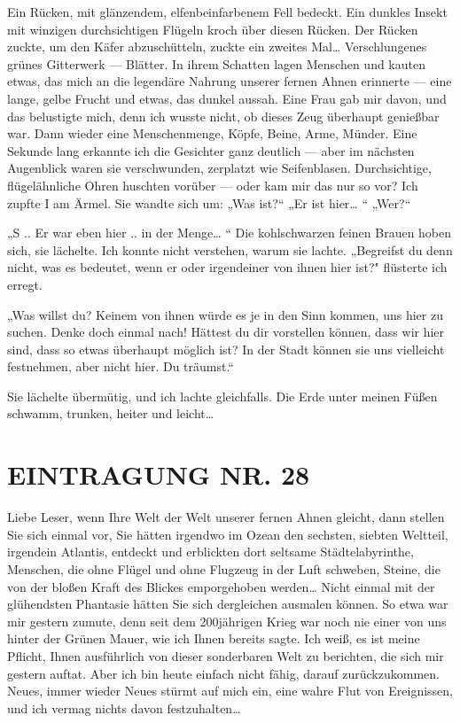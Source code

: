 Ein Rücken, mit glänzendem, elfenbeinfarbenem Fell bedeckt. Ein
dunkles Insekt mit winzigen durchsichtigen Flügeln kroch über
diesen Rücken. Der Rücken zuckte, um den Käfer abzuschütteln,
zuckte ein zweites Mal\ldots{} Verschlungenes grünes Gitterwerk —
Blätter. In ihrem Schatten lagen Menschen und kauten etwas, das
mich an die legendäre Nahrung unserer fernen Ahnen erinnerte — eine
lange, gelbe Frucht und etwas, das dunkel aussah. Eine Frau gab mir
davon, und das belustigte mich, denn ich wusste nicht, ob dieses
Zeug überhaupt genießbar war. Dann wieder eine Menschenmenge,
Köpfe, Beine, Arme, Münder. Eine Sekunde lang erkannte ich die
Gesichter ganz deutlich — aber im nächsten Augenblick waren sie
verschwunden, zerplatzt wie Seifenblasen. Durchsichtige,
flügelähnliche Ohren huschten vorüber — oder kam mir das nur so
vor? Ich zupfte I am Ärmel. Sie wandte sich um: „Was ist?“ „Er ist
hier\ldots{} “ „Wer?“

„S .. Er war eben hier .. in der Menge\ldots{} “ Die kohlschwarzen
feinen Brauen hoben sich, sie lächelte. Ich konnte nicht verstehen,
warum sie lachte. „Begreifst du denn nicht, was es bedeutet, wenn
er oder irgendeiner von ihnen hier ist?" flüsterte ich erregt.

„Was willst du? Keinem von ihnen würde es je in den Sinn kommen,
uns hier zu suchen. Denke doch einmal nach! Hättest du dir
vorstellen können, dass wir hier sind, dass so etwas überhaupt
möglich ist? In der Stadt können sie uns vielleicht festnehmen,
aber nicht hier. Du träumst.“

Sie lächelte übermütig, und ich lachte gleichfalls. Die Erde unter
meinen Füßen schwamm, trunken, heiter und leicht\ldots{}

\section{EINTRAGUNG NR. 28}

Liebe Leser, wenn Ihre Welt der Welt unserer fernen Ahnen gleicht,
dann stellen Sie sich einmal vor, Sie hätten irgendwo im Ozean den
sechsten, siebten Weltteil, irgendein Atlantis, entdeckt und
erblickten dort seltsame Städtelabyrinthe, Menschen, die ohne
Flügel und ohne Flugzeug in der Luft schweben, Steine, die von der
bloßen Kraft des Blickes emporgehoben werden\ldots{} Nicht einmal mit
der glühendsten Phantasie hätten Sie sich dergleichen ausmalen
können. So etwa war mir gestern zumute, denn seit dem 200jährigen
Krieg war noch nie einer von uns hinter der Grünen Mauer, wie ich
Ihnen bereits sagte. Ich weiß, es ist meine Pflicht, Ihnen
ausführlich von dieser sonderbaren Welt zu berichten, die sich mir
gestern auftat. Aber ich bin heute einfach nicht fähig, darauf
zurückzukommen. Neues, immer wieder Neues stürmt auf mich ein, eine
wahre Flut von Ereignissen, und ich vermag nichts davon
festzuhalten\ldots{}


